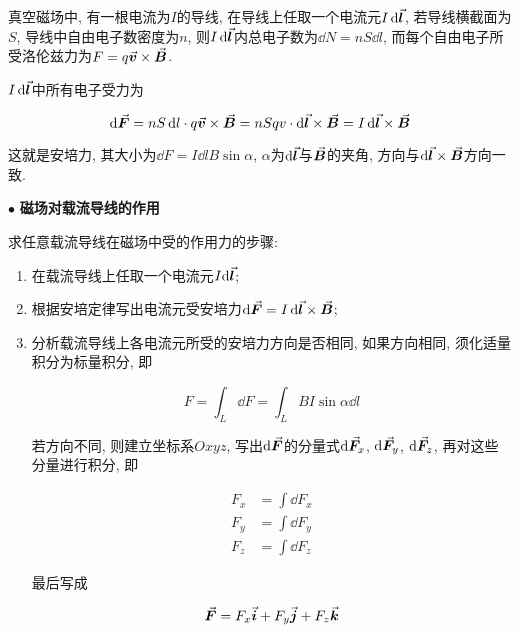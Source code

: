 \begin{axiom}[安培定律]
	
	真空磁场中, 有一根电流为$I$的导线, 在导线上任取一个电流元$I\dd{\va*{l}}$, 若导线横截面为$S$, 导线中自由电子数密度为$n$, 则$I\dd{\va*{l}}$内总电子数为$\dd{N} = nS\dd{l}$, 而每个自由电子所受洛伦兹力为$F = q\va*{v} \times \va*{B}$. 
	
	$I\dd{\va*{l}}$中所有电子受力为
	
	\begin{equation}
		\dd{\va*{F}} = nS\dd{l} \cdot q\va*{v} \times \va*{B} = nSqv \cdot \dd{\va*{l}} \times \va*{B} = I\dd{\va*{l}} \times \va*{B} \label{C8-eq15}
	\end{equation}
	
	这就是安培力, 其大小为$\dd{F} = I \dd{l} B \sin \alpha$, $\alpha$为$\dd\va*{l}$与$\va*{B}$的夹角, 方向与$\dd\va*{l} \times \va*{B}$方向一致. 
	
\end{axiom}

$\bullet$ \textbf{磁场对载流导线的作用}

求任意载流导线在磁场中受的作用力的步骤: 

\begin{enumerate}[itemindent=1em]
	
	\item 在载流导线上任取一个电流元$I\dd\va*{l}$;
	
	\item 根据安培定律写出电流元受安培力$\dd{\va*{F}} = I\dd{\va*{l}} \times \va*{B}$;
	
	\item 分析载流导线上各电流元所受的安培力方向是否相同, 如果方向相同, 须化适量积分为标量积分, 即
	
	\begin{equation*}
		F = \int_{L} \dd{F} = \int_{L} BI\sin\alpha \dd{l}
	\end{equation*}
	
	若方向不同, 则建立坐标系$Oxyz$, 写出$\dd{\va*{F}}$的分量式$\dd{\va*{F}_x}$, $\dd{\va*{F}_y}$, $\dd{\va*{F}_z}$, 再对这些分量进行积分, 即
	
	\begin{align*}
		F_x &= \int \dd{F_x} \\
		F_y &= \int \dd{F_y} \\
		F_z &= \int \dd{F_z}
	\end{align*}
	
	最后写成
	
	\begin{equation*}
		\va*{F} = F_x \va*{i} + F_y \va*{j} + F_z \va*{k}
	\end{equation*}
	
\end{enumerate}

